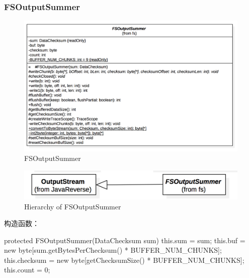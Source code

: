 \subsubsection{FSOutputSummer}

\begin{figure}
\centering
\includegraphics[width =1\linewidth]{uml/outputstream/4.png}
\caption{FSOutputSummer}
\label{fig:FSOutputSummer}
\end{figure}

\begin{figure}
\centering
\includegraphics[width =1\linewidth]{uml/outputstream/5.png}
\caption{Hierarchy of FSOutputSummer}
\label{fig:Hierarchy of FSOutputSummer}
\end{figure}

构造函数：
\begin{java}
protected FSOutputSummer(DataChecksum sum) {
  this.sum = sum;
  this.buf = new byte[sum.getBytesPerChecksum() * BUFFER_NUM_CHUNKS];
  this.checksum = new byte[getChecksumSize() * BUFFER_NUM_CHUNKS];
  this.count = 0;
}
\end{java}

\endinput
